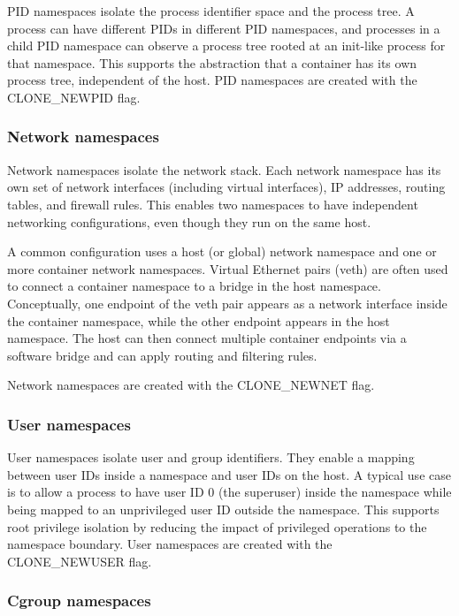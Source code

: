\documentclass[11pt,a4paper,openany]{report}
\begin{document}
PID namespaces isolate the process identifier space and the process tree. A process can have different PIDs in different PID namespaces, and processes in a child PID namespace can observe a process tree rooted at an init-like process for that namespace. This supports the abstraction that a container has its own process tree, independent of the host. PID namespaces are created with the CLONE\_NEWPID flag.

\subsubsection*{Network namespaces}

Network namespaces isolate the network stack. Each network namespace has its own set of network interfaces (including virtual interfaces), IP addresses, routing tables, and firewall rules. This enables two namespaces to have independent networking configurations, even though they run on the same host.

A common configuration uses a host (or global) network namespace and one or more container network namespaces. Virtual Ethernet pairs (veth) are often used to connect a container namespace to a bridge in the host namespace. Conceptually, one endpoint of the veth pair appears as a network interface inside the container namespace, while the other endpoint appears in the host namespace. The host can then connect multiple container endpoints via a software bridge and can apply routing and filtering rules.

Network namespaces are created with the CLONE\_NEWNET flag.

\subsubsection*{User namespaces}

User namespaces isolate user and group identifiers. They enable a mapping between user IDs inside a namespace and user IDs on the host. A typical use case is to allow a process to have user ID 0 (the superuser) inside the namespace while being mapped to an unprivileged user ID outside the namespace. This supports root privilege isolation by reducing the impact of privileged operations to the namespace boundary. User namespaces are created with the CLONE\_NEWUSER flag.

\subsubsection*{Cgroup namespaces}
\end{document}
